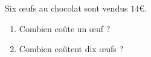 
\begin{exercice}\label{exo2smath-0124}

Six œufs au chocolat sont vendus $14$€.
\begin{enumerate}
    \item
 Combien coûte un œuf ?
 \item
 Combien coûtent dix œufs ?
\end{enumerate}


\end{exercice}
